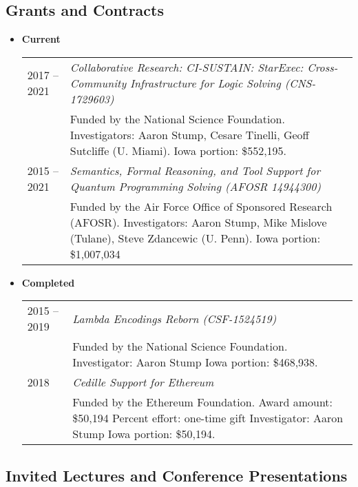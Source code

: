\documentclass[10pt]{article}
\begin{document}
\subsection*{Grants and Contracts}
\smallskip

\begin{itemize}

\item[] \textbf{Current}
\\[1.3ex]
\begin{tabular}{l@{\quad\ }p{34em}} 
 2017 -- 2021 
 & \emph{Collaborative Research: CI-SUSTAIN: StarExec: Cross-Community Infrastructure for Logic Solving (CNS-1729603)} \\
 & Funded by the National Science Foundation. 
   Investigators: Aaron Stump, Cesare Tinelli, Geoff Sutcliffe (U. Miami). 
   Iowa portion: \$552,195.
   \smallskip \\
 2015 -- 2021 
 & \emph{Semantics, Formal Reasoning, and Tool Support for Quantum Programming Solving (AFOSR 14944300)} \\
 & Funded by the Air Force Office of Sponsored Research (AFOSR). 
   Investigators: Aaron Stump, Mike Mislove (Tulane), Steve Zdancewic (U. Penn).
   Iowa portion: \$1,007,034
\end{tabular}

\item[] \textbf{Completed}
\\[1.3ex]
\begin{tabular}{l@{\quad\ }p{34em}} 
 2015 -- 2019
 & \emph{Lambda Encodings Reborn (CSF-1524519)} \\
 & Funded by the National Science Foundation. 
   Investigator: Aaron Stump
   Iowa portion: \$468,938.
   \smallskip \\
 2018
 & \emph{Cedille Support for Ethereum} \\
 & Funded by the Ethereum Foundation. 
   Award amount: \$50,194
   Percent effort: one-time gift 
   Investigator: Aaron Stump
   Iowa portion: \$50,194.

\end{tabular}

\end{itemize}

\subsection*{Invited Lectures and Conference Presentations}
\smallskip
\end{document}

